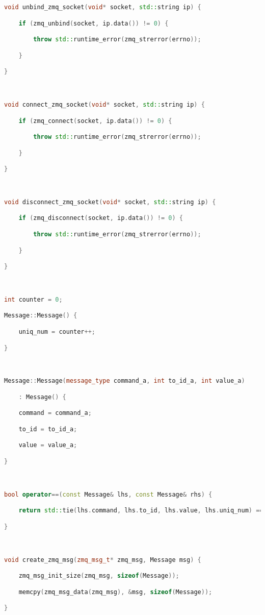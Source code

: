 \begin{lstlisting}[language=C++]
void unbind_zmq_socket(void* socket, std::string ip) {

    if (zmq_unbind(socket, ip.data()) != 0) {

        throw std::runtime_error(zmq_strerror(errno));

    }

}



void connect_zmq_socket(void* socket, std::string ip) {

    if (zmq_connect(socket, ip.data()) != 0) {

        throw std::runtime_error(zmq_strerror(errno));

    }

}



void disconnect_zmq_socket(void* socket, std::string ip) {

    if (zmq_disconnect(socket, ip.data()) != 0) {

        throw std::runtime_error(zmq_strerror(errno));

    }

}



int counter = 0;

Message::Message() {

    uniq_num = counter++;

}



Message::Message(message_type command_a, int to_id_a, int value_a)

    : Message() {

    command = command_a;

    to_id = to_id_a;

    value = value_a;

}



bool operator==(const Message& lhs, const Message& rhs) {

    return std::tie(lhs.command, lhs.to_id, lhs.value, lhs.uniq_num) == std::tie(rhs.command, rhs.to_id, rhs.value, rhs.uniq_num);

}



void create_zmq_msg(zmq_msg_t* zmq_msg, Message msg) {

    zmq_msg_init_size(zmq_msg, sizeof(Message));

    memcpy(zmq_msg_data(zmq_msg), &msg, sizeof(Message));

}




\end{lstlisting}
